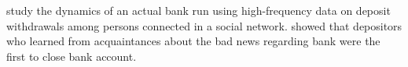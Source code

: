 \href{https://www.aeaweb.org/articles?id=10.1257/aer.102.4.1414}{\cite{iyer2012understanding}} study the dynamics of an actual bank run using high-frequency data on deposit withdrawals among persons connected in a social network.   \href{https://www.aeaweb.org/articles?id=10.1257/aer.90.5.1110}{\cite{kelly2000market}} showed that depositors who learned from acquaintances about the bad news regarding bank were the first to close bank account.



